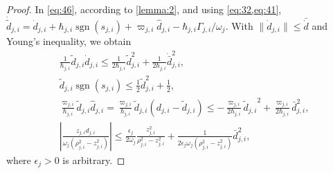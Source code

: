 \documentclass[pdflatex,sn-mathphys-num]{sn-jnl}%
\theoremstyle{thmstyleone}%
\theoremstyle{thmstyletwo}%
\theoremstyle{thmstylethree}%
\begin{document}
\begin{proof}

In \cref{eq:46}, according to \cref{lemma:2}, and using \cref{eq:32,eq:41},
$\dot{\tilde d}_{j,i}=\dot d_{j,i}+\hbar_{j,i}\operatorname{sgn}(s_{j,i})+\varpi_{j,i}\hat d_{j,i}-\hbar_{j,i}\Gamma_{j,i}/\omega_j$. With $\|\dot d_{j,i}\|\le\bar{\dot d}$ and Young's inequality, we obtain
\begin{subequations}\label{eq:50}
\begin{align}
	&\frac{1}{\hbar_{{j,i}}} \tilde{d}_{{j,i}} \dot{d}_{{j,i}}
	\leq \frac{1}{2\hbar_{{j,i}}} \tilde{d}_{{j,i}}^2 + \frac{ 1}{2\hbar_{{j,i}}} \dot{\bar{d}}_{{j,i}}^2,\\
	&
	\tilde{d}_{{j,i}} \operatorname{sgn}(s_{{j,i}})
	\leq \frac{1}{2} \tilde{d}_{{j,i}}^2 + \frac{1}{2},\\
	&
	\frac{\varpi_{{j,i}}}{\hbar_{{j,i}}} \tilde{d}_{{j,i}} {\hat d}_{{j,i}} =\frac{\varpi_{{j,i}}}{\hbar_{{j,i}}} \tilde{d}_{{j,i}}({d}_{{j,i}}-\tilde{d}_{{j,i}})  
	 \leq -\frac{\varpi_{{j,i}}}{2 \hbar_{{j,i}}}{\tilde{d}_{{j,i}}}^2+\frac{\varpi_{{j,i}}}{2 \hbar_{{j,i}}}{{\bar d}^2_{{j,i}}},\\
	 &
	 \left| \frac{z_{{j,i}} d_{{j,i}}}{\omega_j(\rho_{{j,i}}^2 - z_{{j,i}}^2)} \right| \le
	\frac{\epsilon_j}{2 \omega_j} \frac{z_{{j,i}}^2}{\rho_{{j,i}}^2 - z_{{j,i}}^2}+\frac{1}{2\epsilon_j \omega_j  (\rho_{{j,i}}^2 - z_{{j,i}}^2)} {\bar d}^2_{{j,i}},
	\end{align}
\end{subequations}
where $\epsilon_j >0$ is arbitrary.




\end{proof}
\end{document}
